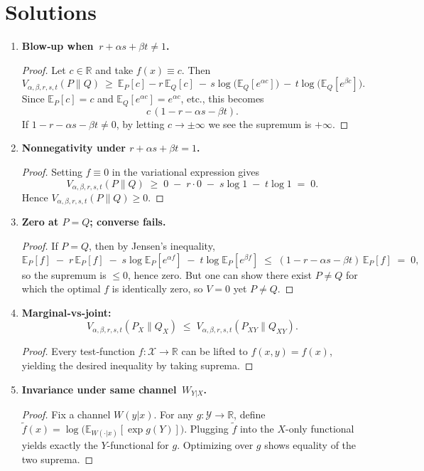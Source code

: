 \documentclass[12pt]{article}
\theoremstyle{definition}
\theoremstyle{remark}
\begin{document}
\section*{Solutions}

\begin{enumerate}[label=\arabic*.]
%
\item \textbf{Blow‐up when \(\,r+\alpha s+\beta t\neq1\).}
\begin{proof}
Let \(c\in\mathbb R\) and take \(f(x)\equiv c\).  Then
\[
V_{\alpha,\beta,r,s,t}(P\|Q)
~\ge~
\mathbb E_P[c]-r\,\mathbb E_Q[c]
~-\,s\log\bigl(\mathbb E_Q[e^{\alpha c}]\bigr)
~-\,t\log\bigl(\mathbb E_Q[e^{\beta c}]\bigr).
\]
Since \(\mathbb E_P[c]=c\) and \(\mathbb E_Q[e^{\alpha c}]=e^{\alpha c}\), etc., this becomes
\[
c\,(1-r-\alpha s-\beta t).
\]
If \(1-r-\alpha s-\beta t\neq0\), by letting \(c\to\pm\infty\) we see the supremum is \(+\infty\).
\end{proof}

\medskip
\item \textbf{Nonnegativity under \(r+\alpha s+\beta t=1\).}
\begin{proof}
Setting \(f\equiv0\) in the variational expression gives
\[
V_{\alpha,\beta,r,s,t}(P\|Q)\;\ge\;
0\;-\;r\cdot0\;-\;s\log1\;-\;t\log1
\;=\;0.
\]
Hence \(V_{\alpha,\beta,r,s,t}(P\|Q)\ge0\).
\end{proof}

\medskip
\item \textbf{Zero at \(P=Q\); converse fails.}
\begin{proof}
If \(P=Q\), then by Jensen’s inequality,
\[
\mathbb E_P[f]
\;-\;r\,\mathbb E_P[f]
\;-\;s\log\mathbb E_P[e^{\alpha f}]
\;-\;t\log\mathbb E_P[e^{\beta f}]
\;\le\;
(1-r-\alpha s-\beta t)\,\mathbb E_P[f]
\;=\;0,
\]
so the supremum is \(\le0\), hence zero.  But one can show there exist \(P\neq Q\) for which the optimal \(f\) is identically zero, so \(V=0\) yet \(P\neq Q\).
\end{proof}

\medskip
\item \textbf{Marginal‐vs‐joint:}
\[
V_{\alpha,\beta,r,s,t}(P_X\|Q_X)
\;\le\;
V_{\alpha,\beta,r,s,t}(P_{XY}\|Q_{XY}).
\]
\begin{proof}
Every test‐function \(f\colon\mathcal X\to\mathbb R\) can be lifted to \(f(x,y)=f(x)\), yielding the desired inequality by taking suprema.
\end{proof}

\medskip
\item \textbf{Invariance under same channel \(\,W_{Y|X}\).}
\begin{proof}
Fix a channel \(W(y|x)\).  For any \(g\colon\mathcal Y\to\mathbb R\), define
\(\tilde f(x)=\log\bigl(\mathbb E_{W(\cdot|x)}[\exp g(Y)]\bigr)\).
Plugging \(\tilde f\) into the \(X\)-only functional yields exactly the \(Y\)-functional for \(g\).  Optimizing over \(g\) shows equality of the two suprema.
\end{proof}


\end{enumerate}
\end{document}
